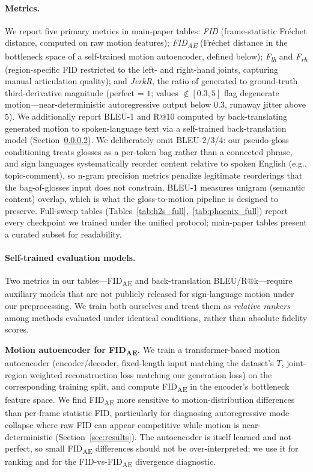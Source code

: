 \documentclass{article}
\begin{document}
\paragraph{Metrics.}
We report five primary metrics in main-paper tables: \emph{FID} (frame-statistic Fr\'echet distance, computed on raw motion features); \emph{FID\textsubscript{AE}} (Fr\'echet distance in the bottleneck space of a self-trained motion autoencoder, defined below); \emph{F\textsubscript{lh}} and \emph{F\textsubscript{rh}} (region-specific FID restricted to the left- and right-hand joints, capturing manual articulation quality); and \emph{JerkR}, the ratio of generated to ground-truth third-derivative magnitude (perfect = $1$; values $\not\in [0.3, 5]$ flag degenerate motion---near-deterministic autoregressive output below $0.3$, runaway jitter above $5$).
We additionally report BLEU-1 and R@10 computed by back-translating generated motion to spoken-language text via a self-trained back-translation model (Section~\ref{sec:eval_models}). We deliberately omit BLEU-2/3/4: our pseudo-gloss conditioning treats glosses as a per-token bag rather than a connected phrase, and sign languages systematically reorder content relative to spoken English (e.g., topic-comment), so n-gram precision metrics penalize legitimate reorderings that the bag-of-glosses input does not constrain. BLEU-1 measures unigram (semantic content) overlap, which is what the gloss-to-motion pipeline is designed to preserve.
Full-sweep tables (Tables~\ref{tab:h2s_full},~\ref{tab:phoenix_full}) report every checkpoint we trained under the unified protocol; main-paper tables present a curated subset for readability.

\paragraph{Self-trained evaluation models.}
\label{sec:eval_models}
Two metrics in our tables---FID\textsubscript{AE} and back-translation BLEU/R@k---require auxiliary models that are not publicly released for sign-language motion under our preprocessing. We train both ourselves and treat them as \emph{relative rankers} among methods evaluated under identical conditions, rather than absolute fidelity scores.

\textbf{Motion autoencoder for FID\textsubscript{AE}.} We train a transformer-based motion autoencoder (encoder/decoder, fixed-length input matching the dataset's $T$, joint-region weighted reconstruction loss matching our generation loss) on the corresponding training split, and compute FID\textsubscript{AE} in the encoder's bottleneck feature space. We find FID\textsubscript{AE} more sensitive to motion-distribution differences than per-frame statistic FID, particularly for diagnosing autoregressive mode collapse where raw FID can appear competitive while motion is near-deterministic (Section~\ref{sec:results}). The autoencoder is itself learned and not perfect, so small FID\textsubscript{AE} differences should not be over-interpreted; we use it for ranking and for the FID-vs-FID\textsubscript{AE} divergence diagnostic.
\end{document}
